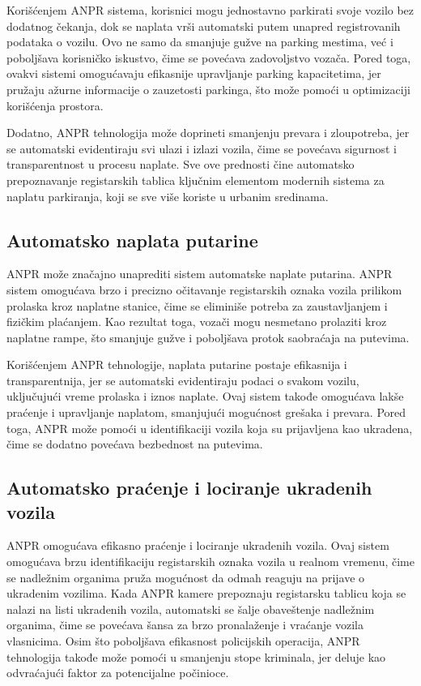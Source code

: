 \documentclass[a4paper,12pt]{article}
\begin{document}
	Korišćenjem ANPR sistema, korisnici mogu jednostavno parkirati svoje vozilo bez dodatnog čekanja, dok se naplata vrši automatski putem unapred registrovanih podataka o vozilu. Ovo ne samo da smanjuje gužve na parking mestima, već i poboljšava korisničko iskustvo, čime se povećava zadovoljstvo vozača. Pored toga, ovakvi sistemi omogućavaju efikasnije upravljanje parking kapacitetima, jer pružaju ažurne informacije o zauzetosti parkinga, što može pomoći u optimizaciji korišćenja prostora. 
	
	Dodatno, ANPR tehnologija može doprineti smanjenju prevara i zloupotreba, jer se automatski evidentiraju svi ulazi i izlazi vozila, čime se povećava sigurnost i transparentnost u procesu naplate. Sve ove prednosti čine automatsko prepoznavanje registarskih tablica ključnim elementom modernih sistema za naplatu parkiranja, koji se sve više koriste u urbanim sredinama.
	
	\subsection{Automatsko naplata putarine}
	ANPR može značajno unaprediti sistem automatske naplate putarina. ANPR sistem omogućava brzo i precizno očitavanje registarskih oznaka vozila prilikom prolaska kroz naplatne stanice, čime se eliminiše potreba za zaustavljanjem i fizičkim plaćanjem. Kao rezultat toga, vozači mogu nesmetano prolaziti kroz naplatne rampe, što smanjuje gužve i poboljšava protok saobraćaja na putevima.
	
	Korišćenjem ANPR tehnologije, naplata putarine postaje efikasnija i transparentnija, jer se automatski evidentiraju podaci o svakom vozilu, uključujući vreme prolaska i iznos naplate. Ovaj sistem takođe omogućava lakše praćenje i upravljanje naplatom, smanjujući mogućnost grešaka i prevara. Pored toga, ANPR može pomoći u identifikaciji vozila koja su prijavljena kao ukradena, čime se dodatno povećava bezbednost na putevima.
	
	\subsection{Automatsko praćenje i lociranje ukradenih vozila}
	ANPR omogućava efikasno praćenje i lociranje ukradenih vozila. Ovaj sistem omogućava brzu identifikaciju registarskih oznaka vozila u realnom vremenu, čime se nadležnim organima pruža mogućnost da odmah reaguju na prijave o ukradenim vozilima. Kada ANPR kamere prepoznaju registarsku tablicu koja se nalazi na listi ukradenih vozila, automatski se šalje obaveštenje nadležnim organima, čime se povećava šansa za brzo pronalaženje i vraćanje vozila vlasnicima. Osim što poboljšava efikasnost policijskih operacija, ANPR tehnologija takođe može pomoći u smanjenju stope kriminala, jer deluje kao odvraćajući faktor za potencijalne počinioce.
	
\end{document}
